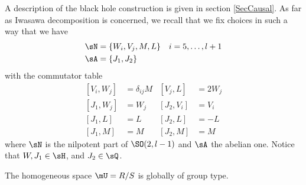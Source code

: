 A description of the black hole construction is given in section \ref{SecCausal}. As far as Iwasawa decomposition is concerned, we recall that we fix choices in such a way that we have
\begin{subequations}
\begin{align}
\sN&=\{W_i,V_j,M,L\}&\text{$i=5,\ldots, l+1$}\\
\sA&=\{J_1,J_2\}
\end{align}
\end{subequations}
 with the commutator table
\begin{subequations} %
\begin{align}
[V_i,W_j]&=\delta_{ij}M &[V_j,L]&=2W_j\\
[J_1,W_j]&=W_j       &[J_2,V_i]&=V_i\\
[J_1,L]&=L           &[J_2,L]&=-L\\
[J_1,M]&=M           &[J_2,M]&=M
\end{align}
\end{subequations}
  where $\sN$ is the nilpotent part of $\SO(2,l-1)$ and $\sA$ the abelian one. Notice that $W,J_{1}\in\sH$, and $J_{2}\in\sQ$.




\begin{proposition}
The homogeneous space $\mU=R/S$ is globally of group type.
\label{PropRsurSglobgroup}
\end{proposition}

